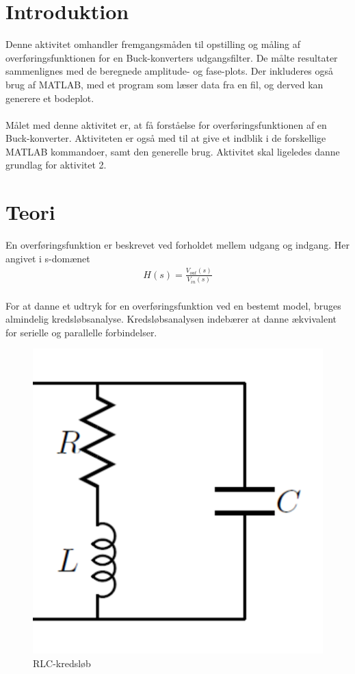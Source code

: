 \section{Introduktion}\label{sec:intro}
Denne aktivitet omhandler fremgangsmåden til opstilling og måling af overføringsfunktionen for en Buck-konverters udgangsfilter. De målte resultater sammenlignes med de beregnede amplitude- og fase-plots. Der inkluderes også brug af MATLAB, med et program som læser data fra en fil, og derved kan generere et bodeplot. \\
\\
Målet med denne aktivitet er, at få forståelse for overføringsfunktionen af en Buck-konverter. 
Aktiviteten er også med til at give et indblik i de forskellige MATLAB kommandoer, samt den generelle brug. 
Aktivitet skal ligeledes danne grundlag for aktivitet 2. 

\section{Teori}\label{sec:teori}
En overføringsfunktion er beskrevet ved forholdet mellem udgang og indgang. Her angivet i s-domænet
\begin{align}
	H(s) = \frac{V_{out}(s)}{V_{in}(s)}
\end{align}
\\
For at danne et udtryk for en overføringsfunktion ved en bestemt model, bruges almindelig kredsløbsanalyse. Kredsløbsanalysen indebærer at danne ækvivalent for serielle og parallelle forbindelser.

\begin{figure}[h!]
	\centering
	\includegraphics[width=.2\textwidth]{rlc.png}
	\caption{RLC-kredsløb}
	\label{fig:rlc}
\end{figure}

